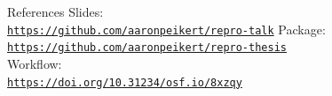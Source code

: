 \documentclass[12pt,t]{beamer}
\begin{document}
\begin{frame}[c]{References}
	\textcolor{lolit}{Slides:\\}\href{https://github.com/aaronpeikert/repro-talk}{\texttt{\textcolor{foreground}{https://github.com/aaronpeikert/repro-talk}}}
	\textcolor{lolit}{Package:\\}\href{https://github.com/aaronpeikert/repro-thesis}{\texttt{\textcolor{foreground}{https://github.com/aaronpeikert/repro-thesis}}}\\
	\textcolor{lolit}{Workflow:\\}\href{https://doi.org/10.31234/osf.io/8xzqy}{\texttt{\textcolor{foreground}{https://doi.org/10.31234/osf.io/8xzqy}}}
\end{frame}

\begin{frame}[c]
  \Huge
\end{frame}
\end{document}
